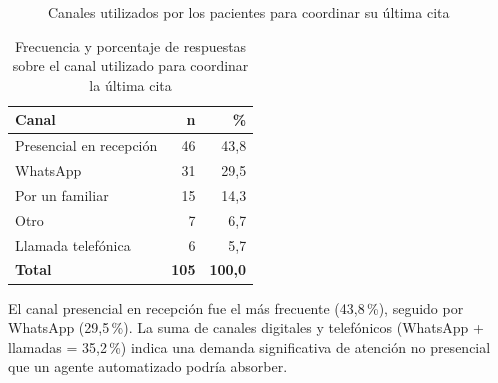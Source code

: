 \medskip
\begin{figure}[H]
\centering
{}
\caption{Canales utilizados por los pacientes para coordinar su última cita}
\label{fig:p8_barras}
\end{figure}

\begin{table}[H]
\centering
\caption{Frecuencia y porcentaje de respuestas sobre el canal utilizado para coordinar la última cita}
\label{tab:p8_frecuencia}
\fontsize{10}{12}\selectfont
\renewcommand{\arraystretch}{1.2}
\begin{tabular}{|l|r|r|}
\hline
\textbf{Canal} & \textbf{n} & \textbf{\%} \\ \hline
Presencial en recepción & 46 & 43{,}8 \\ \hline
WhatsApp                & 31 & 29{,}5 \\ \hline
Por un familiar         & 15 & 14{,}3 \\ \hline
Otro                    & 7  &  6{,}7 \\ \hline
Llamada telefónica      & 6  &  5{,}7 \\ \hline
\textbf{Total}          & \textbf{105} & \textbf{100{,}0} \\ \hline
\end{tabular}
\end{table}

\smallskip
El canal presencial en recepción fue el más frecuente (43{,}8\,\%), seguido por WhatsApp
(29{,}5\,\%). La suma de canales digitales y telefónicos (WhatsApp + llamadas = 35{,}2\,\%)
indica una demanda significativa de atención no presencial que un agente automatizado
podría absorber.

